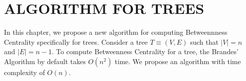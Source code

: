 \chapter{ALGORITHM FOR TREES}
\newtheorem{theorem}{Theorem}
\newtheorem{corollary}{Corollary}[theorem]
\newtheorem{lemma}[theorem]{Lemma}
\label{chap:dpp}

In this chapter, we propose a new algorithm for computing Betweennness Centrality specifically for trees. Consider a tree $T \equiv (V,E)$ such that $|V|=n$ and $|E|=n-1$.
To compute Betweenness Centrality for a tree, the Brandes' Algorithm by default takes $O(n^2)$ time.
We propose an algorithm with time complexity of $O(n)$.








